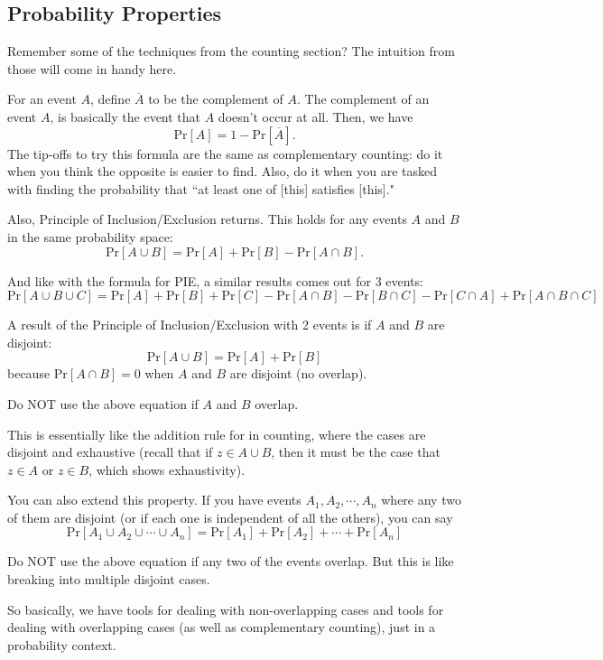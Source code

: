 \documentclass[11pt]{scrartcl}
\begin{document}
\subsection{Probability Properties}

Remember some of the techniques from the counting section? The intuition from those will come in handy here.

For an event $A$, define $\overline{A}$ to be the complement of $A$. The complement of an event $A$, is basically the event that $A$ doesn't occur at all. Then, we have \[\text{Pr}[A] = 1 - \text{Pr}[\overline{A}].\] The tip-offs to try this formula are the same as complementary counting: do it when you think the opposite is easier to find. Also, do it when you are tasked with finding the probability that ``at least one of [this] satisfies [this]."

Also, Principle of Inclusion/Exclusion returns. This holds for any events $A$ and $B$ in the same probability space: \[\text{Pr}[A \cup B] = \text{Pr}[A] + \text{Pr}[B] - \text{Pr}[A \cap B].\]

And like with the formula for PIE, a similar results comes out for 3 events: \[\text{Pr}[A \cup B \cup C] = \text{Pr}[A] + \text{Pr}[B] + \text{Pr}[C] - \text{Pr}[A \cap B] - \text{Pr}[B \cap C] - \text{Pr}[C \cap A] + \text{Pr}[A \cap B \cap C]\]

A result of the Principle of Inclusion/Exclusion with 2 events is if $A$ and $B$ are disjoint: \[\text{Pr}[A \cup B] = \text{Pr}[A] + \text{Pr}[B]\] because $\text{Pr}[A \cap B] = 0$ when $A$ and $B$ are disjoint (no overlap).

Do NOT use the above equation if $A$ and $B$ overlap.

This is essentially like the addition rule for in counting, where the cases are disjoint and exhaustive (recall that if $z \in A \cup B$, then it must be the case that $z \in A$ or $z \in B$, which shows exhaustivity).

You can also extend this property. If you have events $A_1, A_2, \cdots, A_n$ where any two of them are disjoint (or if each one is independent of all the others), you can say \[\text{Pr}[A_1 \cup A_2 \cup \cdots \cup A_n] = \text{Pr}[A_1] + \text{Pr}[A_2] + \cdots + \text{Pr}[A_n]\]

Do NOT use the above equation if any two of the events overlap. But this is like breaking into multiple disjoint cases.

So basically, we have tools for dealing with non-overlapping cases and tools for dealing with overlapping cases (as well as complementary counting), just in a probability context.
\end{document}
